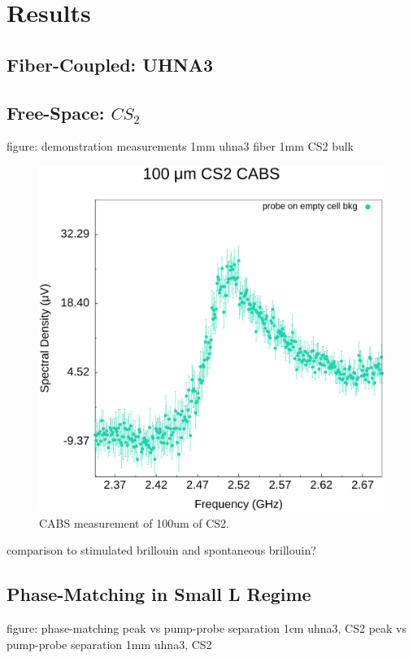 \section{Results}
\label{sec:CABS:Results}
\lipsum[1]

  \subsection{Fiber-Coupled: UHNA3}
  \label{subsec:CABS:Results:UHNA3}
  \lipsum[1]

  \subsection{Free-Space: \texorpdfstring{$CS_{2}$}{CS2}}
  \label{subsec:CABS:Results:CS2}
  \lipsum[1]
  figure: demonstration measurements
    1mm uhna3 fiber
    1mm CS2 bulk

    \begin{figure}[t]
        \centering
        \includegraphics[width=\textwidth]{figs/4-CABS/CABS-100um CS2.png}
        \caption{CABS measurement of 100um of CS2.}
        \label{fig:CABS 100um CS2}
    \end{figure}

    comparison to stimulated brillouin and spontaneous brillouin?

  \subsection{Phase-Matching in Small L Regime}
  \label{subsec:CABS:Results:Phase-Matching}
  \lipsum[1]
  figure: phase-matching
    peak vs pump-probe separation 1cm uhna3, CS2
    peak vs pump-probe separation 1mm uhna3, CS2

